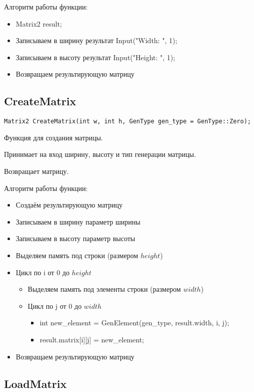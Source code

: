 Алгоритм работы функции:

\begin{itemize}
	\item Matrix2 result{};
	\item Записываем в ширину результат Input("Width: ", 1);
	\item Записываем в высоту результат Input("Height: ", 1);
	\item Возвращаем результирующую матрицу
\end{itemize}

\subsection*{CreateMatrix}

\begin{lstlisting}[label={lst:CreateMatrix}]
	Matrix2 CreateMatrix(int w, int h, GenType gen_type = GenType::Zero);
\end{lstlisting}

Функция для создания матрицы.

Принимает на вход ширину, высоту и тип генерации матрицы.

Возвращает матрицу.

Алгоритм работы функции:

\begin{itemize}
	\item Создаём результирующую матрицу
	\item Записываем в ширину параметр ширины
	\item Записываем в высоту параметр высоты
	\item Выделяем память под строки (размером $ height $)
	\item Цикл по i от 0 до $ height $
	\begin{itemize}
		\item Выделяем память под элементы строки (размером $ width $)
		\item Цикл по j от 0 до $ width $
		\begin{itemize}
			  \item int new\_element = GenElement(gen\_type, result.width, i, j);
			  \item result.matrix[i][j] = new\_element;
		\end{itemize}
	\end{itemize}
	\item Возвращаем результирующую матрицу
\end{itemize}

\subsection*{LoadMatrix}

